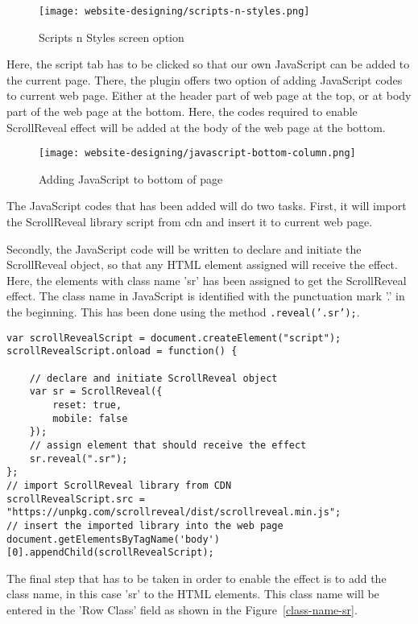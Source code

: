 \begin{figure}[ht]
\centering
\caption{Scripts n Styles screen option}
\label{scripts-n-styles}
\texttt{[image: website-designing/scripts-n-styles.png]}
\end{figure}

Here, the script tab has to be clicked so that our own JavaScript can be added to the current page. There, the plugin offers two option of adding JavaScript codes to current web page. Either at the header part of web page at the top, or at body part of the web page at the bottom. Here, the codes required to enable ScrollReveal effect will be added at the body of the web page at the bottom.

\begin{figure}[ht]
\centering
\caption{Adding JavaScript to bottom of page}
\label{javascript-bottom-column}
\texttt{[image: website-designing/javascript-bottom-column.png]}
\end{figure}

The JavaScript codes that has been added will do two tasks. First, it will import the ScrollReveal library script from \ac{cdn} and insert it to current web page.

Secondly, the JavaScript code will be written to declare and initiate the ScrollReveal object, so that any HTML element assigned will receive the effect. Here, the elements with class name 'sr' has been assigned to get the ScrollReveal effect. The class name in JavaScript is identified with the punctuation mark '.' in the beginning. This has been done using the method \texttt{.reveal('.sr');}.

\begin{lstlisting}
var scrollRevealScript = document.createElement("script");
scrollRevealScript.onload = function() {

    // declare and initiate ScrollReveal object
    var sr = ScrollReveal({
        reset: true,
        mobile: false
    });
    // assign element that should receive the effect
    sr.reveal(".sr");
};
// import ScrollReveal library from CDN
scrollRevealScript.src = "https://unpkg.com/scrollreveal/dist/scrollreveal.min.js";
// insert the imported library into the web page
document.getElementsByTagName('body')[0].appendChild(scrollRevealScript);
\end{lstlisting}

The final step that has to be taken in order to enable the effect is to add the class name, in this case 'sr' to the HTML elements. This class name will be entered in the 'Row Class' field as shown in the Figure~\ref{class-name-sr}.

